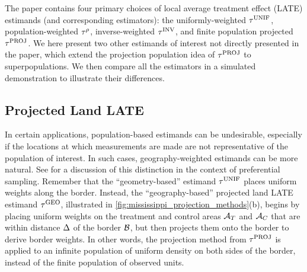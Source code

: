 The paper contains four primary choices of local average treatment effect (LATE) estimands (and corresponding estimators): the uniformly-weighted \(\tau^{\mathrm{UNIF}}\), population-weighted \(\tau^{\rho}\), inverse-weighted \(\tau^{\mathrm{INV}}\), and finite population projected \(\tau^{\mathrm{PROJ}}\).
We here present two other estimands of interest not directly presented in the paper, which extend the projection population idea of \(\tau^{\mathrm{PROJ}}\) to superpopulations.
We then compare all the estimators in a simulated demonstration to illustrate their differences.

\subsection{Projected Land LATE}
In certain applications, population-based estimands can be undesirable, especially if the locations at which measurements are made are not representative of the population of interest.
In such cases, geography-weighted estimands can be more natural.
See \cite{antonelli2016positive} for a discussion of this distinction in the context of preferential sampling.
Remember that the ``geometry-based'' estimand \(\tau^{\mathrm{UNIF}}\) places uniform weights along the border.
Instead, the ``geography-based'' projected land LATE estimand \(\tau^{\mathrm{GEO}}\), illustrated in \autoref{fig:mississippi_projection_methods}(b), begins by placing uniform weights on the treatment and control areas \(\mathcal{A}_T\) and \(\mathcal{A}_C\) that are within distance \(\Delta\) of the border \(\mathcal{B}\), but then projects them onto the border to derive border weights.
In other words, the projection method from \(\tau^{\mathrm{PROJ}}\) is applied to an infinite population of uniform density on both sides of the border, instead of the finite population of observed units.

